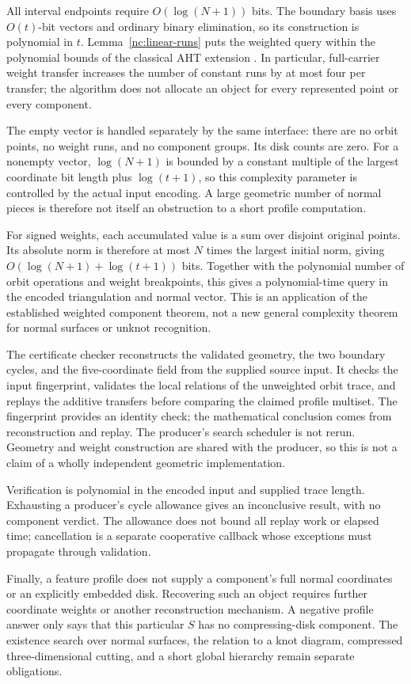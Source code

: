 All interval endpoints require $O(\log(N+1))$ bits.  The boundary
basis uses $O(t)$-bit vectors and ordinary binary elimination,
so its construction is polynomial in $t$.  Lemma~\ref{nc:linear-runs}
puts the weighted query within the polynomial bounds of the
classical AHT extension \cite{AHT2006}.  In particular, full-carrier
weight transfer increases the number of constant runs by at
most four per transfer; the algorithm does not allocate an
object for every represented point or every component.

The empty vector is handled separately by the same interface:
there are no orbit points, no weight runs, and no component
groups.  Its disk counts are zero.  For a nonempty vector,
$\log(N+1)$ is bounded by a constant multiple of the largest
coordinate bit length plus $\log(t+1)$, so this complexity
parameter is controlled by the actual input encoding.  A large
geometric number of normal pieces is therefore not itself an
obstruction to a short profile computation.

For signed weights, each accumulated value is a sum over
disjoint original points.  Its absolute norm is therefore at
most $N$ times the largest initial norm, giving
$O(\log(N+1)+\log(t+1))$ bits.  Together with the polynomial
number of orbit operations and weight breakpoints, this gives
a polynomial-time query in the encoded triangulation and
normal vector.  This is an application of the established
weighted component theorem, not a new general complexity
theorem for normal surfaces or unknot recognition.

The certificate checker reconstructs the validated geometry,
the two boundary cycles, and the five-coordinate field from
the supplied source input.  It checks the input fingerprint,
validates the local relations of the unweighted orbit trace,
and replays the additive transfers before comparing the
claimed profile multiset.  The fingerprint provides an identity
check; the mathematical conclusion comes from reconstruction
and replay.  The producer's search scheduler is not rerun.
Geometry and weight construction are shared with the producer,
so this is not a claim of a wholly independent geometric
implementation.

Verification is polynomial in the encoded input and supplied
trace length.  Exhausting a producer's cycle allowance gives
an inconclusive result, with no component verdict.  The
allowance does not bound all replay work or elapsed time;
cancellation is a separate cooperative callback whose
exceptions must propagate through validation.

Finally, a feature profile does not supply a component's full
normal coordinates or an explicitly embedded disk.  Recovering
such an object requires further coordinate weights or another
reconstruction mechanism.  A negative profile answer only
says that this particular $S$ has no compressing-disk component.
The existence search over normal surfaces, the relation to a
knot diagram, compressed three-dimensional cutting, and a
short global hierarchy remain separate obligations.
